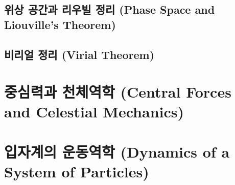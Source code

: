 \documentclass[chapter, oneside, b5paper]{oblivoir}
\theoremstyle{plain}
\theoremstyle{definition}
\theoremstyle{remark}
\begin{document}
\section{위상 공간과 리우빌 정리 (Phase Space and Liouville's Theorem)}

\section{비리얼 정리 (Virial Theorem)}

\newpage
\chapter{중심력과 천체역학 (Central Forces and Celestial Mechanics)}

\newpage
\chapter{입자계의 운동역학 (Dynamics of a System of Particles)}
\end{document}

